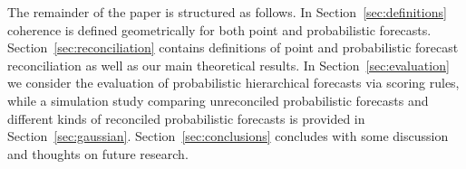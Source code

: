 \documentclass[12pt]{article}
\theoremstyle{definition}
\begin{document}
The remainder of the paper is structured as follows. In Section~\ref{sec:definitions} coherence is defined geometrically for both point and probabilistic forecasts. Section~\ref{sec:reconciliation} contains definitions of point and probabilistic forecast reconciliation as well as our main theoretical results. In Section~\ref{sec:evaluation} we consider the evaluation of probabilistic hierarchical forecasts via scoring rules, while a simulation study comparing unreconciled probabilistic forecasts and different kinds of reconciled probabilistic forecasts is provided in Section~\ref{sec:gaussian}. Section~\ref{sec:conclusions} concludes with some discussion and thoughts on future research.



\end{document}
